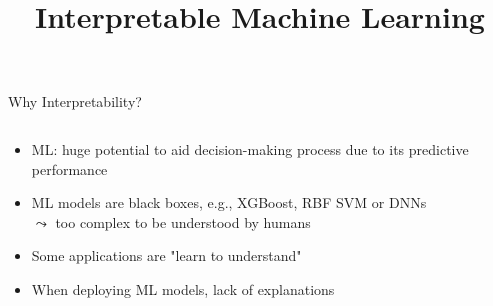 \documentclass[11pt,compress,t,notes=noshow, aspectratio=169, xcolor=table]{beamer}
\title{Interpretable Machine Learning}
\date{}
\begin{document}
\newcommand{\titlefigure}{figure/performance_vs_interpretability}
\newcommand{\learninggoals}{
\item Why interpretability?
\item Developments until now?
\item Use cases for interpretability}


\begin{frame}{Why Interpretability?}
    \begin{columns}[T, totalwidth=\textwidth]
    \begin{column}{0.8\textwidth}
		\begin{itemize}
			\item ML: huge potential to aid decision-making process due to its predictive performance
			\item ML models are black boxes, e.g., XGBoost, RBF SVM or DNNs \\ 
            $\leadsto$ too complex to be understood by humans
			\item Some applications are "learn to understand"
			\item When deploying ML models, lack of explanations 

\end{itemize}
\end{column}
\end{columns}
\end{frame}
\end{document}
